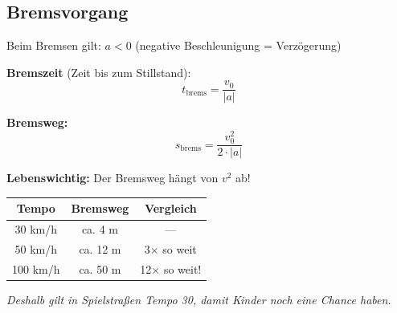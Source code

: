 \documentclass[11pt,a4paper]{article}
\begin{document}
\subsection{Bremsvorgang}

Beim Bremsen gilt: $a < 0$ (negative Beschleunigung = Verzögerung)

\begin{formelbox}[Bremsformeln]
\textbf{Bremszeit} (Zeit bis zum Stillstand):
\[
t_{\text{brems}} = \frac{v_0}{|a|}
\]

\textbf{Bremsweg:}
\[
s_{\text{brems}} = \frac{v_0^2}{2 \cdot |a|}
\]
\end{formelbox}

\begin{warnung}
\textbf{Lebenswichtig:} Der Bremsweg hängt von $v^2$ ab!
\begin{center}
\begin{tabular}{|c|c|c|}
\hline
\rowcolor{lightblue}
\textbf{Tempo} & \textbf{Bremsweg} & \textbf{Vergleich} \\
\hline
30 km/h & ca. 4 m & --- \\
\hline
50 km/h & ca. 12 m & 3× so weit \\
\hline
100 km/h & ca. 50 m & 12× so weit! \\
\hline
\end{tabular}
\end{center}
\textit{Deshalb gilt in Spielstraßen Tempo 30, damit Kinder noch eine Chance haben.}
\end{warnung}
\end{document}
